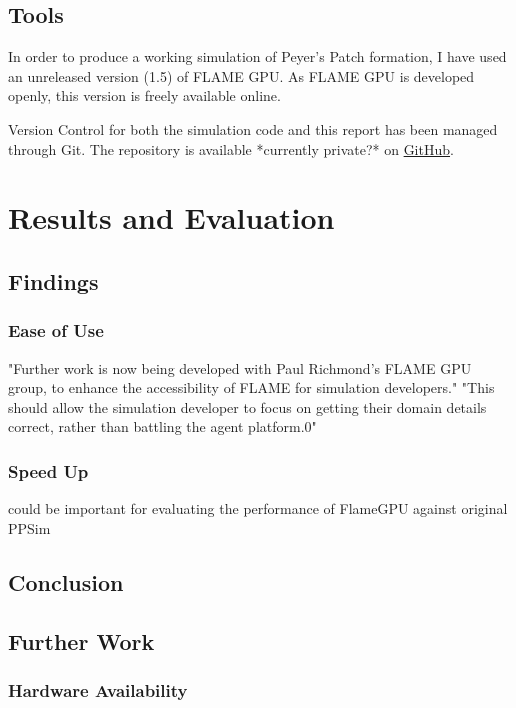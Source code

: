 \documentclass{UoYCSproject}
\begin{document}
\section{Tools}
In order to produce a working simulation of Peyer's Patch formation, I have used an unreleased version (1.5) of FLAME GPU.
As FLAME GPU is developed openly, this version is freely available online\cite{flame_github}.


Version Control for both the simulation code and this report has been managed through Git.
The repository is available *currently private?* on \href{https://github.com/oliver-binns/PRIY.git}{GitHub}.

\chapter{Results and Evaluation}
\label{results}

\section{Findings}
\subsection{Ease of Use}
"Further work is now being developed with Paul Richmond's FLAME GPU group, to enhance the accessibility of FLAME for simulation developers."
"This should allow the simulation developer to focus on getting their domain details correct, rather than battling the agent platform.0"

\subsection{Speed Up}
\cite{statistical_tests} could be important for evaluating the performance of FlameGPU against original PPSim

\section{Conclusion}

\section{Further Work}
\subsection{Hardware Availability}
\end{document}
